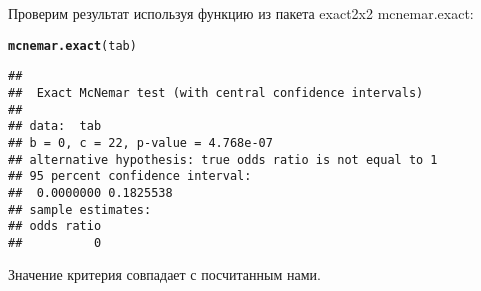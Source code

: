 \documentclass{article}\usepackage[]{graphicx}\usepackage[]{color}
\makeatletter
\newcommand{\hlstd}[1]{\textcolor[rgb]{0.345,0.345,0.345}{#1}}%
\newcommand{\hlkwd}[1]{\textcolor[rgb]{0.737,0.353,0.396}{\textbf{#1}}}%
\newenvironment{kframe}{%
 \def\at@end@of@kframe{}%
 \ifinner\ifhmode%
  \def\at@end@of@kframe{\end{minipage}}%
  \begin{minipage}{\columnwidth}%
 \fi\fi%
 \def\FrameCommand##1{\hskip\@totalleftmargin \hskip-\fboxsep
 \colorbox{shadecolor}{##1}\hskip-\fboxsep
     \hskip-\linewidth \hskip-\@totalleftmargin \hskip\columnwidth}%
 \MakeFramed {\advance\hsize-\width
   \@totalleftmargin\z@ \linewidth\hsize
   \@setminipage}}%
 {\par\unskip\endMakeFramed%
 \at@end@of@kframe}
\newenvironment{knitrout}{}{} %
\makeatother
\begin{document}
Проверим результат используя функцию из пакета exact2x2 mcnemar.exact:
\begin{knitrout}
\color{fgcolor}\begin{kframe}


{\ttfamily\noindent\itshape\color{messagecolor}{\#\# Loading required package: exactci}}

{\ttfamily\noindent\itshape\color{messagecolor}{\#\# Loading required package: ssanv}}\end{kframe}
\end{knitrout}
\begin{knitrout}
\color{fgcolor}\begin{kframe}
\begin{alltt}
\hlkwd{mcnemar.exact}\hlstd{(tab)}
\end{alltt}
\begin{verbatim}
## 
## 	Exact McNemar test (with central confidence intervals)
## 
## data:  tab
## b = 0, c = 22, p-value = 4.768e-07
## alternative hypothesis: true odds ratio is not equal to 1
## 95 percent confidence interval:
##  0.0000000 0.1825538
## sample estimates:
## odds ratio 
##          0
\end{verbatim}
\end{kframe}
\end{knitrout}
Значение критерия совпадает с посчитанным нами.
\end{document}
